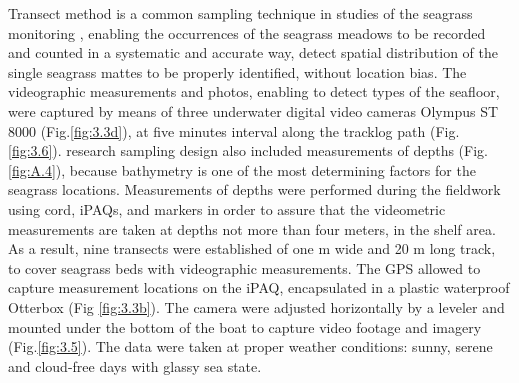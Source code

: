 \documentclass[10pt, a4paper]{article}
\begin{document}
Transect method is a common sampling technique in studies of the seagrass monitoring \cite{Shortis07}\label{Shortis07},
enabling the occurrences of the seagrass meadows to be recorded and counted in a systematic and
accurate way, detect spatial distribution of the single seagrass mattes to be properly identified,
without location bias. 
The videographic measurements and photos, enabling to detect types of the
seafloor, were captured by means of three underwater digital video cameras Olympus ST 8000  (Fig.\ref{fig:3.3d}), at
five minutes interval along the tracklog path (Fig.\ref{fig:3.6}).
research sampling design also included measurements of depths (Fig. \ref{fig:A.4}), because bathymetry is one of the
most determining factors for the seagrass locations. Measurements of depths were performed during
the fieldwork using cord, iPAQs, and markers in order to assure that the videometric measurements
are taken at depths not more than four meters, in the shelf area.
As a result, nine transects were established of one m wide and 20 m long track, to cover seagrass beds
with videographic measurements. The GPS allowed to capture measurement locations on the iPAQ,
encapsulated in a plastic waterproof Otterbox (Fig \ref{fig:3.3b}). The camera were adjusted horizontally by a leveler and
 mounted under the bottom of the boat to capture video footage and imagery (Fig.\ref{fig:3.5}). The data
were taken at proper weather conditions: sunny, serene and cloud-free days with glassy sea state. 
\end{document}

